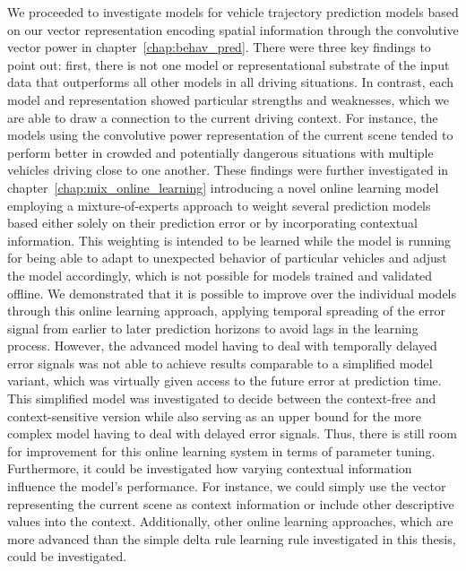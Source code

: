 We proceeded to investigate models for vehicle trajectory prediction models based on our vector representation encoding spatial information through the convolutive vector power in chapter~\ref{chap:behav_pred}.
There were three key findings to point out: first, there is not one model or representational substrate of the input data that outperforms all other models in all driving situations.
In contrast, each model and representation showed particular strengths and weaknesses, which we are able to draw a connection to the current driving context.
For instance, the models using the convolutive power representation of the current scene tended to perform better in crowded and potentially dangerous situations with multiple vehicles driving close to one another.
These findings were further investigated in chapter~\ref{chap:mix_online_learning} introducing a novel online learning model employing a mixture-of-experts approach to weight several prediction models based either solely on their prediction error or by incorporating contextual information.
This weighting is intended to be learned while the model is running for being able to adapt to unexpected behavior of particular vehicles and adjust the model accordingly, which is not possible for models trained and validated offline.
We demonstrated that it is possible to improve over the individual models through this online learning approach, applying temporal spreading of the error signal from earlier to later prediction horizons to avoid lags in the learning process.
However, the advanced model having to deal with temporally delayed error signals was not able to achieve results comparable to a simplified model variant, which was virtually given access to the future error at prediction time.
This simplified model was investigated to decide between the context-free and context-sensitive version while also serving as an upper bound for the more complex model having to deal with delayed error signals.
Thus, there is still room for improvement for this online learning system in terms of parameter tuning.
Furthermore, it could be investigated how varying contextual information influence the model's performance.
For instance, we could simply use the vector representing the current scene as context information or include other descriptive values into the context.
Additionally, other online learning approaches, which are more advanced than the simple delta rule learning rule investigated in this thesis, could be investigated.

